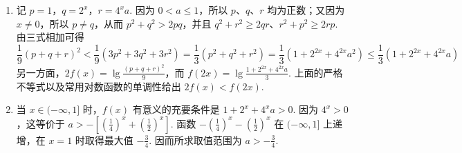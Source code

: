 \begin{solution}
\begin{enumerate}
\item 记 \(p=1\)，\(q=2^x\)，\(r=4^xa\). 因为 \(0<a\leqslant1\)，所以 \(p\)、\(q\)、\(r\) 均为正数；又因为 \(x\neq0\)，所以 \(p\neq q\)，从而 \(p^2+q^2>2pq\)，并且 \(q^2+r^2\geqslant2qr\)、\(r^2+p^2\geqslant2rp\). 由三式相加可得
\[
\frac{1}{9}(p+q+r)^2
<\frac{1}{9}\left(3p^2+3q^2+3r^2\right)
=\frac{1}{3}(p^2+q^2+r^2)
=\frac{1}{3}\left(1+2^{2x}+4^{2x}a^2\right)
\leqslant\frac{1}{3}\left(1+2^{2x}+4^{2x}a\right)
\]
另一方面，\(2f(x)=\lg\frac{(p+q+r)^2}{9}\)，而 \(f(2x)=\lg\frac{1+2^{2x}+4^{2x}a}{3}\). 上面的严格不等式以及常用对数函数的单调性给出 \(2f(x)<f(2x)\).

\item 当 \(x\in(-\infty,1]\) 时，\(f(x)\) 有意义的充要条件是 \(1+2^x+4^xa>0\). 因为 \(4^x>0\)，这等价于 \(\displaystyle a>-\left[\left(\frac{1}{4}\right)^x+\left(\frac{1}{2}\right)^x\right]\). 函数 \(-\left(\frac{1}{4}\right)^x-\left(\frac{1}{2}\right)^x\) 在 \((-\infty,1]\) 上递增，在 \(x=1\) 时取得最大值 \(-\frac{3}{4}\). 因而所求取值范围为 \(\displaystyle a>-\frac{3}{4}\).
\end{enumerate}
\end{solution}
